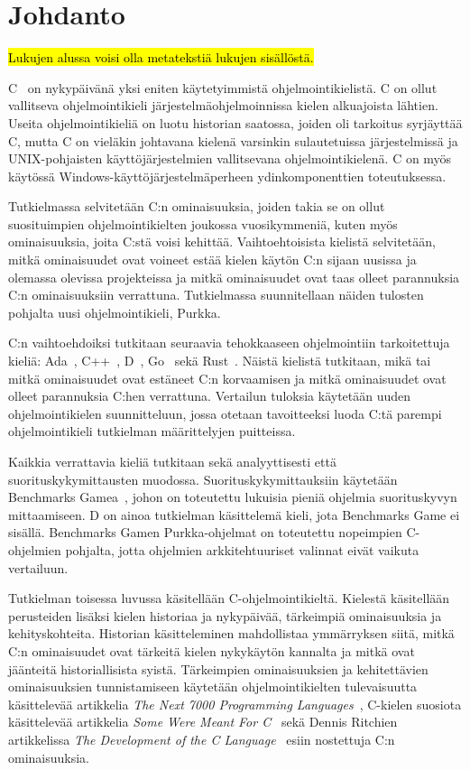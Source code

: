 \section{Johdanto}

\hl{Lukujen alussa voisi olla metatekstiä lukujen sisällöstä.}

\grayrule

C~\citep{C18} on nykypäivänä yksi eniten käytetyimmistä ohjelmointikielistä. C
on ollut vallitseva ohjelmointikieli järjestelmäohjelmoinnissa kielen
alkuajoista lähtien. Useita ohjelmointikieliä on luotu historian saatossa,
joiden oli tarkoitus syrjäyttää C, mutta C on vieläkin johtavana kielenä
varsinkin sulautetuissa järjestelmissä ja UNIX-pohjaisten käyttöjärjestelmien
vallitsevana ohjelmointikielenä. C on myös käytössä
Windows-käyttöjärjestelmäperheen ydinkomponenttien toteutuksessa.

Tutkielmassa selvitetään C:n ominaisuuksia, joiden takia se on ollut
suosituimpien ohjelmointikielten joukossa vuosikymmeniä, kuten myös
ominaisuuksia, joita C:stä voisi kehittää. Vaihtoehtoisista kielistä
selvitetään, mitkä ominaisuudet ovat voineet estää kielen käytön C:n sijaan
uusissa ja olemassa olevissa projekteissa ja mitkä ominaisuudet ovat taas
olleet parannuksia C:n ominaisuuksiin verrattuna. Tutkielmassa suunnitellaan
näiden tulosten pohjalta uusi ohjelmointikieli, Purkka.

C:n vaihtoehdoiksi tutkitaan seuraavia tehokkaaseen ohjelmointiin tarkoitettuja
kieliä: Ada~\citep{ADA12}, C++~\citep{CPP17}, D~\citep{D}, Go~\citep{golang}
sekä Rust~\citep{rust}. Näistä kielistä tutkitaan, mikä tai mitkä ominaisuudet
ovat estäneet C:n korvaamisen ja mitkä ominaisuudet ovat olleet parannuksia
C:hen verrattuna. Vertailun tuloksia käytetään uuden ohjelmointikielen
suunnitteluun, jossa otetaan tavoitteeksi luoda C:tä parempi ohjelmointikieli
tutkielman määrittelyjen puitteissa.

Kaikkia verrattavia kieliä tutkitaan sekä analyyttisesti että
suorituskykymittausten muodossa. Suorituskykymittauksiin käytetään Benchmarks
Gamea~\citep{benchmarks}, johon on toteutettu lukuisia pieniä ohjelmia
suorituskyvyn mittaamiseen. D on ainoa tutkielman käsittelemä kieli, jota
Benchmarks Game ei sisällä. Benchmarks Gamen Purkka-ohjelmat on toteutettu
nopeimpien C-ohjelmien pohjalta, jotta ohjelmien arkkitehtuuriset valinnat
eivät vaikuta vertailuun. 

Tutkielman toisessa luvussa käsitellään C-ohjelmointikieltä. Kielestä
käsitellään perusteiden lisäksi kielen historiaa ja nykypäivää, tärkeimpiä
ominaisuuksia ja kehityskohteita. Historian käsitteleminen mahdollistaa
ymmärryksen siitä, mitkä C:n ominaisuudet ovat tärkeitä kielen nykykäytön
kannalta ja mitkä ovat jäänteitä historiallisista syistä. Tärkeimpien
ominaisuuksien ja kehitettävien ominaisuuksien tunnistamiseen käytetään
ohjelmointikielten tulevaisuutta käsittelevää artikkelia \emph{The Next 7000
Programming Languages}~\citep{next7000}, C-kielen suosiota käsittelevää
artikkelia \emph{Some Were Meant For C}~\citep{somemeantforc} sekä Dennis
Ritchien artikkelissa \emph{The Development of the C Language}~\citep{chistory}
esiin nostettuja C:n ominaisuuksia.

